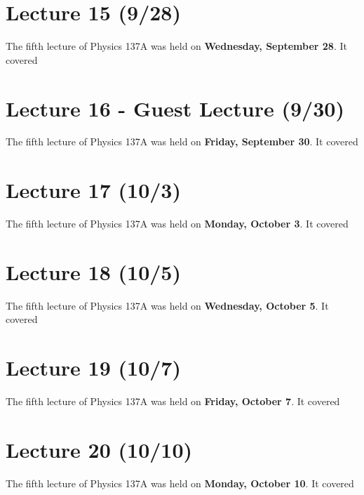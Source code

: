 \documentclass{book}
\theoremstyle{plain}
\begin{document}
      \chapter{Lecture 15 (9/28)}
        The fifth lecture of Physics 137A was held on \textbf{Wednesday, September 28}. It covered
        
      \chapter{Lecture 16 - Guest Lecture (9/30)}
        The fifth lecture of Physics 137A was held on \textbf{Friday, September 30}. It covered
        
      \chapter{Lecture 17 (10/3)}
        The fifth lecture of Physics 137A was held on \textbf{Monday, October 3}. It covered
        
      \chapter{Lecture 18 (10/5)}
        The fifth lecture of Physics 137A was held on \textbf{Wednesday, October 5}. It covered
        
      \chapter{Lecture 19 (10/7)}
        The fifth lecture of Physics 137A was held on \textbf{Friday, October 7}. It covered
        
      \chapter{Lecture 20 (10/10)}
        The fifth lecture of Physics 137A was held on \textbf{Monday, October 10}. It covered
        
\end{document}
